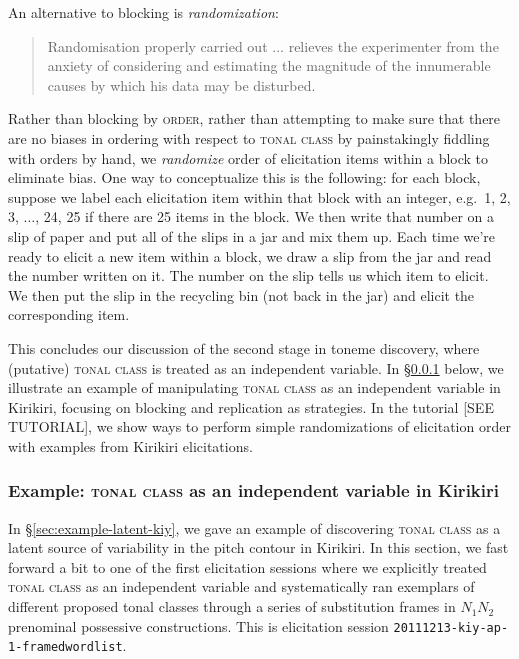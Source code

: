 \documentclass[12pt]{article}
\begin{document}
An alternative to blocking is \textit{randomization}:

\begin{quote}
\textsf{\small{Randomisation properly carried out $\ldots$ relieves the experimenter from the anxiety
of considering and estimating the magnitude of the innumerable causes
by which his data may be disturbed. \citep[p.\ 44]{Fisher:1935}}}
\end{quote}

Rather than blocking by \textsc{order}, rather than attempting to make
sure that there are no biases in ordering with respect to
\textsc{tonal class} by painstakingly fiddling with orders by hand, we
\textit{randomize} order of elicitation items within a block to
eliminate bias. One way to conceptualize this is the following: for
each block, suppose we label each elicitation item within that block
with an integer, e.g.\ 1, 2, 3, $\ldots$, 24, 25 if there are 25 items
in the block. We then write that number on a slip of paper and put all
of the slips in a jar and mix them up. Each time we're ready to elicit
a new item within a block, we draw a slip from the jar and read the
number written on it. The number on the slip tells us which item to
elicit. We then put the slip in the recycling bin (not back in the
jar) and elicit the corresponding item. 

This concludes our discussion of the second stage in toneme discovery,
where (putative) \textsc{tonal class} is treated as an independent
variable. In \S\ref{sec:kiy-iv} below, we illustrate an example of
manipulating \textsc{tonal class} as an independent variable in
Kirikiri, focusing on blocking and replication as strategies. In the
tutorial [SEE TUTORIAL], we show ways to perform simple randomizations of
elicitation order with examples from Kirikiri elicitations.

\subsubsection{Example: \textsc{tonal class} as an independent variable in
Kirikiri}
\label{sec:kiy-iv}

In \S\ref{sec:example-latent-kiy}, we gave an example of discovering
\textsc{tonal class} as a latent source of variability in the pitch
contour in Kirikiri. In this section, we fast forward a bit to one of
the first elicitation sessions where we explicitly treated
\textsc{tonal class} as an independent variable and systematically ran
exemplars of different proposed tonal classes through a series of
substitution frames in $N_1 N_2$ prenominal possessive
constructions. This is elicitation session
\texttt{20111213-kiy-ap-1-framedwordlist}.
\end{document}
